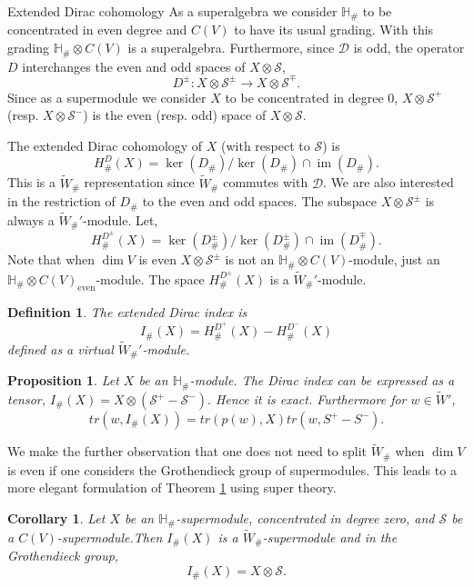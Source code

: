 \documentclass[a4paper,10pt]{amsart}
\newtheorem{definition}[theorem]{Definition}
\newtheorem{corollary}[theorem]{Corollary}
\newtheorem{proposition}[theorem]{Proposition}
\DeclareMathOperator{\im}{im}
\DeclareMathOperator{\even}{even}
\begin{document}
\begin{section}{Extended Dirac cohomology}
As a superalgebra we consider $\mathbb{H}_\#$ to be concentrated in even degree and $C(V)$ to have its usual grading. With this grading $\mathbb{H}_\#\otimes C(V)$ is a superalgebra. Furthermore, since $\mathcal{D}$ is odd, the operator $D$ interchanges the even and odd spaces of $X\otimes \mathcal{S}$,
$$D^\pm : X\otimes \mathcal{S}^\pm \to X\otimes \mathcal{S}^\mp.$$ 
Since as a supermodule we consider $X$ to be concentrated in degree 0, $X\otimes \mathcal{S}^+$ (resp. $X \otimes \mathcal{S}^-$) is the even (resp. odd) space of $X\otimes \mathcal{S}$.


The extended Dirac cohomology of $X$ (with respect to $\mathcal{S}$) is 
$$H^D_\#(X)  = \ker(D_\#) / \ker(D_\#)\cap \im(D_\#).$$
This is a $\tilde{W}_\#$ representation since $\tilde{W}_\#$ commutes with $\mathcal{D}$.
We are also interested in the restriction of $D_\#$ to the even and odd spaces. The subspace $X\otimes \mathcal{S}^\pm$ is always a $\tilde{W}_\#'$-module.  Let,
$$H^{D^\pm}_\#(X) = \ker(D^\pm_\#) / \ker(D^\pm_\#)\cap \im(D^\mp_\#).$$
Note that when $\dim V$ is even $X\otimes \mathcal{S}^\pm$ is not an $\mathbb{H}_\#\otimes C(V)$-module, just an $\mathbb{H}_\#\otimes C(V)_{\even}$-module. The space $H^{D^\pm}_\#(X)$ is a $\tilde{W}_\#'$-module. 

\begin{definition} The extended Dirac index is 
$$I_\#(X) = H^{D^+}_\#(X) - H^{D^-}_\#(X)$$
defined as a virtual $\tilde{W}_\#'$-module. \end{definition} 


 \begin{proposition}\label{CH15prop5.10} \cite[5.10]{CH15} Let $X$ be an $\mathbb{H}_\#$-module. The Dirac index can be expressed as a tensor, 
 $I_\#(X) = X \otimes (\mathcal{S}^+ - \mathcal{S}^-).$  Hence it is exact. Furthermore for $w \in \tilde{W}'$,
$$ tr(w, I_\#(X)) = tr(p(w),X)tr(w,S^+ - S^-).$$
 
 \end{proposition} 
 
 
 
 We make the further observation that one does not need to split $\tilde{W}_\#$ when $\dim V$ is even if one considers the Grothendieck group of supermodules. This leads to a more elegant formulation of Theorem \ref{CH15prop5.10} using super theory.
 \begin{corollary}\label{superdirac} Let $X$ be an $\mathbb{H}_\#$-supermodule, concentrated in degree zero, and $\mathcal{S}$ be a $C(V)$-supermodule.Then $I_\#(X)$ is a $\tilde{W}_\#$-supermodule and in the Grothendieck group,
 $$I_\#(X) = X \otimes \mathcal{S}.$$
 \end{corollary}


\end{section}
\end{document}
